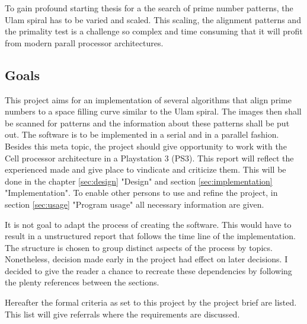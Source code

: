 \begin{figure}[H]
\begin{minipage}[t]{0.475\textwidth}
\centering
\end{minipage}
\hfill
\begin{minipage}[t]{0.475\textwidth}
\centering
\end{minipage}
\end{figure}

To gain profound starting thesis for a the search of prime number patterns, the Ulam spiral has to be varied and scaled. This scaling, the alignment patterns and the primality test is a challenge so complex and time consuming that it will profit from modern parall processor architectures.
 
\subsection{Goals}

This project aims for an implementation of several algorithms that align prime numbers to a space filling curve similar to the Ulam spiral. The images then shall be scanned for patterns and the information about these patterns shall be put out. The software is to be implemented in a serial and in a parallel fashion. 
Besides this meta topic, the project should give opportunity to work with the Cell processor architecture in a Playstation 3 (PS3). This report will reflect the experienced made and give place to vindicate and criticize them. This will be done in the chapter \ref{sec:design} "Design" and section \ref{sec:implementation} "Implementation". To enable other persons to use and refine the project, in section \ref{sec:usage} "Program usage" all necessary information are given.

It is not goal to adapt the process of creating the software. This would have to result in a unstructured report that follows the time line of the implementation. The structure is chosen to group distinct aspects of the process by topics. Nonetheless, decision made early in the project had effect on later decisions. I decided to give the reader a chance to recreate these dependencies by following the plenty references between the sections.

Hereafter the formal criteria as set to this project by the project brief are listed. This list will give referrals where the requirements are discussed.


